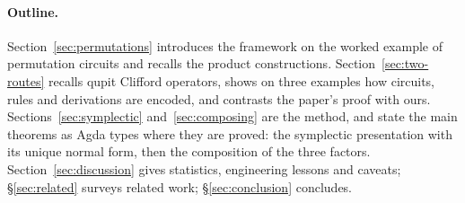 \paragraph{Outline.}
Section~\ref{sec:permutations} introduces the framework on the worked
example of permutation circuits and recalls the product constructions.
Section~\ref{sec:two-routes} recalls qupit Clifford operators, shows
on three examples how circuits, rules and derivations are encoded, and
contrasts the paper's proof with ours.  Sections~\ref{sec:symplectic}
and~\ref{sec:composing} are the method, and state the main theorems as
Agda types where they are proved: the symplectic presentation with its
unique normal form, then the composition of the three factors.  Section~\ref{sec:discussion}
gives statistics, engineering lessons and caveats; \S\ref{sec:related}
surveys related work; \S\ref{sec:conclusion} concludes.
